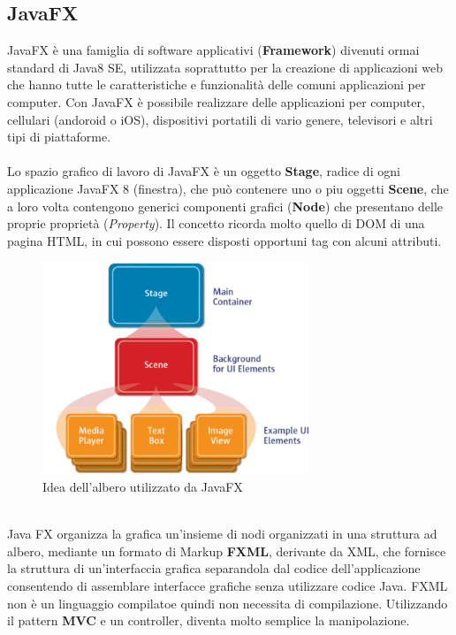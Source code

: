 \documentclass[a4paper, oneside]{book}
\begin{document}
\large
\subsection*{JavaFX}
JavaFX è una famiglia di software applicativi (\textbf{Framework}) divenuti ormai standard di Java8 SE, utilizzata soprattutto per la creazione di applicazioni web che hanno tutte le caratteristiche e funzionalità delle comuni applicazioni per computer. Con JavaFX è possibile realizzare delle applicazioni per computer, cellulari (andoroid o iOS), dispositivi portatili di vario genere, televisori e altri tipi di piattaforme.\\ \\
Lo spazio grafico di lavoro di JavaFX è un oggetto \textbf{Stage}, radice di ogni applicazione JavaFX 8 (finestra), che può contenere uno o piu oggetti \textbf{Scene}, che a loro volta contengono generici componenti grafici (\textbf{Node}) che presentano delle proprie proprietà (\textit{Property}). Il concetto ricorda molto quello di DOM di una pagina HTML, in cui possono essere disposti opportuni tag con alcuni attributi.
\\
\begin{figure}[htp]
\centering
\includegraphics[width=8cm]{stage.png}
\caption{Idea dell'albero utilizzato da JavaFX}
\label{fig:JavaFX}
\end{figure}
\\
Java FX organizza la grafica un'insieme di nodi organizzati in una struttura ad albero, mediante un formato di Markup \textbf{FXML}, derivante da XML, che fornisce la struttura di un'interfaccia grafica separandola dal codice dell'applicazione consentendo di assemblare interfacce grafiche senza utilizzare codice Java. FXML non è un linguaggio compilatoe quindi non necessita di compilazione. Utilizzando il pattern \textbf{MVC} e un controller, diventa molto semplice la manipolazione.
\\
\end{document}
